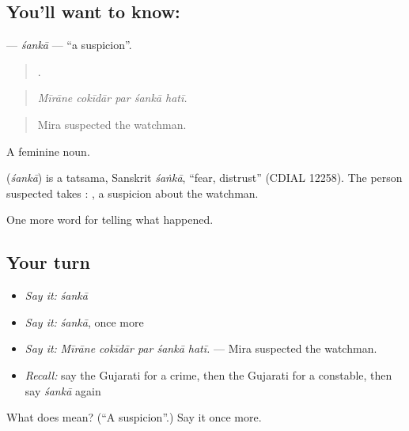 \subsection*{You'll want to know: }
\textbf{} — \emph{śankā} — \textquotedblleft{}a suspicion\textquotedblright{}.

\begin{quote}
    .
\end{quote}

\begin{quote}
\emph{Mīrāne cokīdār par śankā hatī.}
\end{quote}

\begin{quote}
Mira suspected the watchman.
\end{quote}

A feminine noun.

\begin{cousinweb}
\textbf{} (\emph{śankā}) is a tatsama, Sanskrit \emph{śaṅkā}, \textquotedblleft{}fear, distrust\textquotedblright{} (CDIAL 12258). The person suspected takes \textbf{}: \textbf{  }, a suspicion about the watchman.
\end{cousinweb}

\begin{grammarlens}[title={What you've built}]
One more word for telling what happened.
\end{grammarlens}

\subsection*{Your turn}
\begin{itemize}
\raggedright
  \item \emph{Say it:} \emph{śankā}
  \item \emph{Say it:} \emph{śankā}, once more
  \item \emph{Say it:} \emph{Mīrāne cokīdār par śankā hatī.} — Mira suspected the watchman.
  \item \emph{Recall:} say the Gujarati for a crime, then the Gujarati for a constable, then say \emph{śankā} again
\end{itemize}

\begin{tcolorbox}[breakable,colback=teal!4,colframe=teal!35!black,title={Before you move on}]
What does  mean? (\textquotedblleft{}A suspicion\textquotedblright{}.) Say it once more.
\end{tcolorbox}
